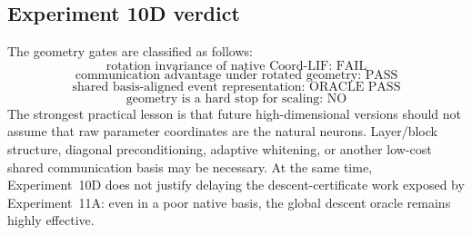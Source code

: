 \subsection{Experiment 10D verdict}

The geometry gates are classified as follows:
\begin{equation}
  \boxed{\text{rotation invariance of native Coord-LIF: FAIL}}
\end{equation}
\begin{equation}
  \boxed{\text{communication advantage under rotated geometry: PASS}}
\end{equation}
\begin{equation}
  \boxed{\text{shared basis-aligned event representation: ORACLE PASS}}
\end{equation}
\begin{equation}
  \boxed{\text{geometry is a hard stop for scaling: NO}}
\end{equation}
The strongest practical lesson is that future high-dimensional versions should not assume that raw parameter coordinates are the natural neurons. Layer/block structure, diagonal preconditioning, adaptive whitening, or another low-cost shared communication basis may be necessary. At the same time, Experiment~10D does not justify delaying the descent-certificate work exposed by Experiment~11A: even in a poor native basis, the global descent oracle remains highly effective.
